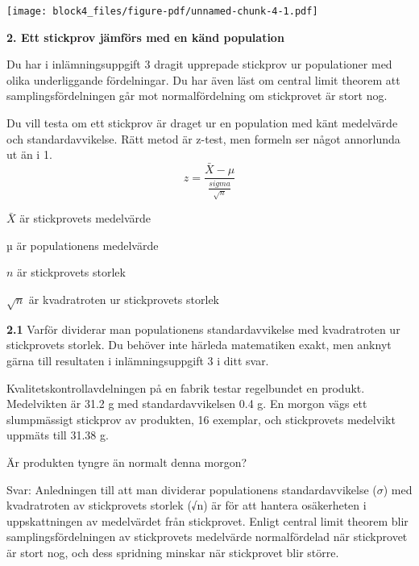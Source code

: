 \documentclass[
  letterpaper,
  DIV=11,
  numbers=noendperiod]{scrartcl}
\begin{document}
\texttt{[image: block4\_files/figure-pdf/unnamed-chunk-4-1.pdf]}

\textbf{2. Ett stickprov jämförs med en känd population}

Du har i inlämningsuppgift 3 dragit upprepade stickprov ur populationer
med olika underliggande fördelningar. Du har även läst om central limit
theorem att samplingsfördelningen går mot normalfördelning om
stickprovet är stort nog.

Du vill testa om ett stickprov är draget ur en population med känt
medelvärde och standardavvikelse. Rätt metod är z-test, men formeln ser
något annorlunda ut än i 1. \[
z = \frac{\bar{X} - \mu}{\frac{sigma}{\sqrt{n}}}
\]

\(\bar{X}\) är stickprovets medelvärde

\(µ\) är populationens medelvärde

\(n\) är stickprovets storlek

\({\sqrt{n}}\) är kvadratroten ur stickprovets storlek

\textbf{2.1} Varför dividerar man populationens standardavvikelse med
kvadratroten ur stickprovets storlek. Du behöver inte härleda
matematiken exakt, men anknyt gärna till resultaten i inlämningsuppgift
3 i ditt svar.

Kvalitetskontrollavdelningen på en fabrik testar regelbundet en produkt.
Medelvikten är 31.2 g med standardavvikelsen 0.4 g. En morgon vägs ett
slumpmässigt stickprov av produkten, 16 exemplar, och stickprovets
medelvikt uppmäts till 31.38 g.

Är produkten tyngre än normalt denna morgon?

\hfill\break
Svar: Anledningen till att man dividerar populationens standardavvikelse
(\(\sigma\)) med kvadratroten av stickprovets storlek (√n) är för att
hantera osäkerheten i uppskattningen av medelvärdet från stickprovet.
Enligt central limit theorem blir samplingsfördelningen av stickprovets
medelvärde normalfördelad när stickprovet är stort nog, och dess
spridning minskar när stickprovet blir större.\\
\end{document}
